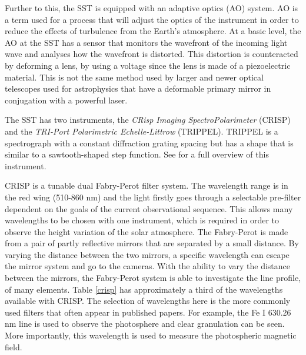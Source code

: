     Further to this, the SST is equipped with an adaptive optics (AO) system. 
	AO is a term used for a process that will adjust the optics of the instrument in order to reduce the effects of turbulence from the Earth's atmosphere. 
	At a basic level, the AO at the SST has a sensor that monitors the wavefront of the incoming light wave and analyses how the wavefront is distorted. 
	This distortion is counteracted by deforming a lens, by using a voltage since the lens is made of a piezoelectric material. 
	This is not the same method used by larger and newer optical telescopes used for astrophysics that have a deformable primary mirror in conjugation with a powerful laser.
	
	The SST has two instruments, the \textit{CRisp Imaging SpectroPolarimeter} (CRISP) and the \textit{TRI-Port Polarimetric Echelle-Littrow} (TRIPPEL).
	TRIPPEL is a spectrograph with a constant diffraction grating spacing but has a shape that is similar to a sawtooth-shaped step function.
    See \cite{2011A&A...535A..14K} for a full overview of this instrument.
    
	CRISP is a tunable dual Fabry-Perot filter system.
    The wavelength range is in the red wing (510-860 nm) and the light firstly goes through a selectable pre-filter dependent on the goals of the current observational sequence.
    This allows many wavelengths to be chosen with one instrument, which is required in order to observe the height variation of the solar atmosphere.
	The Fabry-Perot is made from a pair of partly reflective mirrors that are separated by a small distance.
    By varying the distance between the two mirrors, a specific wavelength can escape the mirror system and go to the cameras.
    With the ability to vary the distance between the mirrors, the Fabry-Perot system is able to investigate the line profile, of many elements.
	Table \ref{crisp} has approximately a third of the wavelengths available with CRISP. 
	The selection of wavelengths here is the more commonly used filters that often appear in published papers.
	For example, the Fe I 630.26 nm line is used to observe the photosphere and clear granulation can be seen.
	More importantly, this wavelength is used to measure the photospheric magnetic field.
	    
